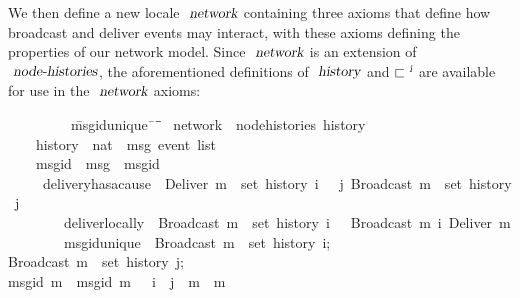 We then define a new locale $\isa{network}$ containing three axioms that define how broadcast and deliver events may interact, with these axioms defining the properties of our network model.
Since $\isa{network}$ is an extension of $\isa{node-histories}$, the aforementioned definitions of $\isa{history}$ and $\sqsubset^\isa{i}$ are available for use in the $\isa{network}$ axioms:
\begin{isabelle}
~~~~~~~~\ \=msg{\isacharunderscore}id{\isacharunderscore}unique{\isacharcolon}\ \={\isasymrbrakk}\ \=\hspace{14em}\=\kill
{}\ network\ {\isacharequal}\ node{\isacharunderscore}histories\ history\\
~~~~\>history\ {\isacharcolon}{\isacharcolon}\ {\isachardoublequoteopen}nat\ {\isasymRightarrow}\ {\isacharprime}msg\ event\ list{\isachardoublequoteclose}\ {\isacharplus}\\
~~~~\>msg{\isacharunderscore}id\ {\isacharcolon}{\isacharcolon}\ {\isachardoublequoteopen}{\isacharprime}msg\ {\isasymRightarrow}\ {\isacharprime}msgid{\isachardoublequoteclose}\\
~~~~\ delivery{\isacharunderscore}has{\isacharunderscore}a{\isacharunderscore}cause{\isacharcolon}\ {\isasymlbrakk}\ {\isachardoublequoteopen}Deliver\ m\ {\isasymin}\ set\ {\isacharparenleft}history\ i{\isacharparenright}\ \>\>\>\>{\isasymrbrakk}\ {\isasymLongrightarrow}\ {\isasymexists}j{\isachardot}\ Broadcast\ m\ {\isasymin}\ set\ {\isacharparenleft}history\ j{\isacharparenright}{\isachardoublequoteclose}\\
~~~~~~~~\>deliver{\isacharunderscore}locally{\isacharcolon}\ \>{\isasymlbrakk}\ \>{\isachardoublequoteopen}Broadcast\ m\ {\isasymin}\ set\ {\isacharparenleft}history\ i{\isacharparenright}\ \>{\isasymrbrakk}\ {\isasymLongrightarrow}\  Broadcast\ m\ {\isasymsqsubset}\isactrlsup i\ Deliver\ m{\isachardoublequoteclose}\\
~~~~~~~~\>msg{\isacharunderscore}id{\isacharunderscore}unique{\isacharcolon}\ \>{\isasymlbrakk}\ \>{\isachardoublequoteopen}Broadcast\ m{}\ {\isasymin}\ set\ {\isacharparenleft}history\ i{\isacharparenright};\\
\>\>\>Broadcast\ m{}\ {\isasymin}\ set\ {\isacharparenleft}history\ j{\isacharparenright};\\
\>\>\>msg{\isacharunderscore}id\ m{}\ {\isacharequal}\ msg{\isacharunderscore}id\ m{}\ \>{\isasymrbrakk}\ {\isasymLongrightarrow}\ i\ {\isacharequal}\ j\ {\isasymand}\ m{}\ {\isacharequal}\ m{}{\isachardoublequoteclose}
\end{isabelle}
